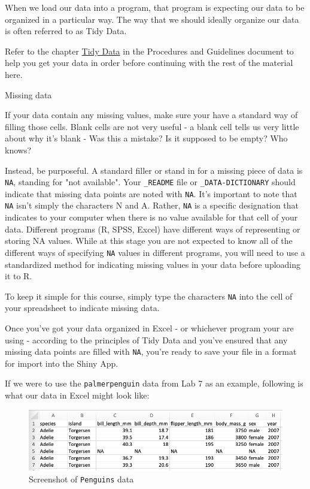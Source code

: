 \documentclass[
]{book}
\begin{document}
When we load our data into a program, that program is expecting our data to be organized in a particular way. The way that we should ideally organize our data is often referred to as Tidy Data.

Refer to the chapter \href{https://ubco-biology.github.io/Procedures-and-Guidelines/tidy-data.html}{Tidy Data} in the Procedures and Guidelines document to help you get your data in order before continuing with the rest of the material here.

Missing data

If your data contain any missing values, make sure your have a standard way of filling those cells. Blank cells are not very useful - a blank cell tells us very little about why it's blank - Was this a mistake? Is it supposed to be empty? Who knows?

Instead, be purposeful. A standard filler or stand in for a missing piece of data is \texttt{NA}, standing for "not available". Your \texttt{\_README} file or \texttt{\_DATA-DICTIONARY} should indicate that missing data points are noted with \texttt{NA}. It's important to note that \texttt{NA} isn't simply the characters N and A. Rather, \texttt{NA} is a specific designation that indicates to your computer when there is no value available for that cell of your data. Different programs (R, SPSS, Excel) have different ways of representing or storing NA values. While at this stage you are not expected to know all of the different ways of specifying \texttt{NA} values in different programs, you will need to use a standardized method for indicating missing values in your data before uploading it to R.

To keep it simple for this course, simply type the characters \texttt{NA} into the cell of your spreadsheet to indicate missing data.

Once you've got your data organized in Excel - or whichever program your are using - according to the principles of Tidy Data and you've ensured that any missing data points are filled with \texttt{NA}, you're ready to save your file in a format for import into the Shiny App.

If we were to use the \texttt{palmerpenguin} data from Lab 7 as an example, following is what our data in Excel might look like:

\begin{figure}
\centering
\includegraphics{figures_images/Penguins-Excel.png}
\caption{Screenshot of \texttt{Penguins} data}
\end{figure}
\end{document}

